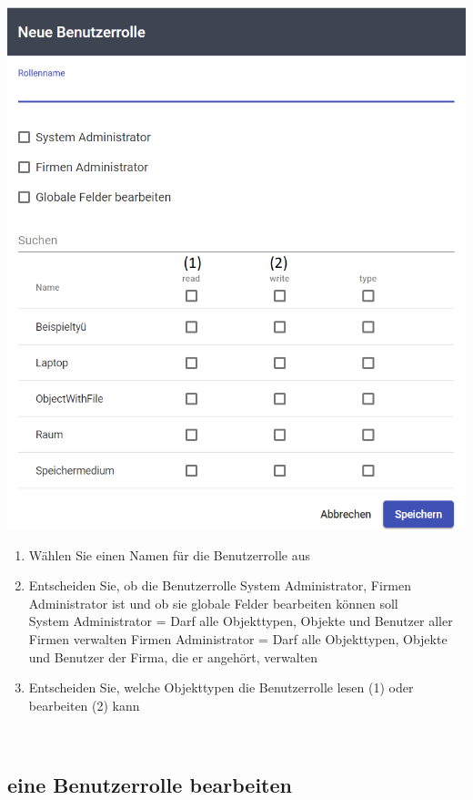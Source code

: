 \documentclass[11pt,a4paper]{report}
\begin{document}
	\begin{minipage}{0.4\linewidth}
	\includegraphics[scale=0.55]{Rollen.png}
	\end{minipage}
	\hfill
	\begin{minipage}{0.4\linewidth}
	\begin{enumerate}[3]
		\item Wählen Sie einen Namen für die Benutzerrolle aus
		\item Entscheiden Sie, ob die Benutzerrolle System Administrator, Firmen Administrator ist und ob sie globale Felder bearbeiten können soll\\
		System Administrator = Darf alle Objekttypen, Objekte und Benutzer aller Firmen verwalten
		Firmen Administrator = Darf alle Objekttypen, Objekte und Benutzer der Firma, die er angehört, verwalten
		\item Entscheiden Sie, welche Objekttypen die Benutzerrolle lesen (1) oder bearbeiten (2) kann
	\end{enumerate}
	\end{minipage}\\

	\subsection{eine Benutzerrolle bearbeiten}
\end{document}
